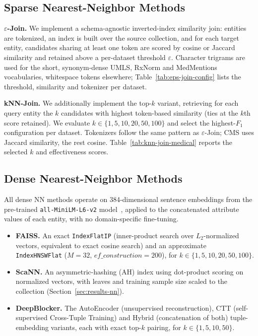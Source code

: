 \documentclass[runningheads]{llncs}
\begin{document}
\subsection{Sparse Nearest-Neighbor Methods}
\textbf{$\varepsilon$-Join.} We implement a schema-agnostic inverted-index similarity join:
entities are tokenized, an index is built over the source collection, and for each target
entity, candidates sharing at least one token are scored by cosine or Jaccard similarity and
retained above a per-dataset threshold $\varepsilon$. Character trigrams are used for the
short, synonym-dense UMLS, RxNorm and MedMentions vocabularies, whitespace tokens elsewhere;
Table~\ref{tab:eps-join-config} lists the threshold, similarity and tokenizer per dataset.

\textbf{kNN-Join.} We additionally implement the top-$k$ variant, retrieving for each query
entity the $k$ candidates with highest token-based similarity (ties at the $k$th score
retained). We evaluate $k \in \{1,5,10,20,50,100\}$ and select the highest-$F_1$ configuration
per dataset. Tokenizers follow the same pattern as $\varepsilon$-Join; CMS uses Jaccard
similarity, the rest cosine. Table~\ref{tab:knn-join-medical} reports the selected $k$ and
effectiveness scores.

\subsection{Dense Nearest-Neighbor Methods}
All dense NN methods operate on 384-dimensional sentence embeddings from the pre-trained
\texttt{all-MiniLM-L6-v2} model~\cite{reimers2019sentencebert}, applied to the concatenated
attribute values of each entity, with no domain-specific fine-tuning.
\begin{itemize}
    \item \textbf{FAISS.} An exact \texttt{IndexFlatIP} (inner-product search over
    $L_2$-normalized vectors, equivalent to exact cosine search) and an approximate
    \texttt{IndexHNSWFlat} ($M=32$, $\mathit{ef\_construction}=200$), for
    $k \in \{1,5,10,20,50,100\}$.
    \item \textbf{ScaNN.} An asymmetric-hashing (AH) index using dot-product scoring on
    normalized vectors, with leaves and training sample size scaled to the collection
    (Section~\ref{sec:results-nn}).
    \item \textbf{DeepBlocker.} The AutoEncoder (unsupervised reconstruction), CTT
    (self-supervised Cross-Tuple Training) and Hybrid (concatenation of both) tuple-embedding
    variants, each with exact top-$k$ pairing, for $k \in \{1,5,10,50\}$.
\end{itemize}
\end{document}
